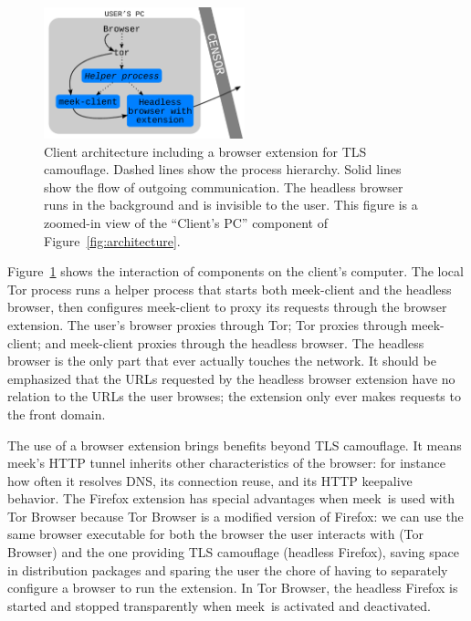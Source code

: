 \documentclass[conference]{IEEEtran}
\newcommand{\meekclient}{\mbox{meek-client}\xspace}
\newcommand{\meek}{meek\xspace}
\begin{document}
\begin{figure}
\centering
\includegraphics[height=1.5in]{browser-architecture}
\caption{
Client architecture including a browser extension for TLS camouflage.
Dashed lines show the process hierarchy.
Solid lines show the flow of outgoing communication.
The headless browser runs in the background and is invisible to the user.
This figure is a zoomed-in view of the ``Client's PC'' component of Figure~\ref{fig:architecture}.
}
\label{fig:browser-architecture}
\end{figure}

Figure~\ref{fig:browser-architecture} shows the interaction of components
on the client's computer.
The local Tor process runs a helper process that starts both \meekclient
and the headless browser,
then configures \meekclient to proxy its requests through the browser extension.
The user's browser proxies through Tor;
Tor proxies through \meekclient;
and \meekclient proxies through the headless browser.
The headless browser is the only part that ever actually touches the network.
It should be emphasized that the URLs requested by the headless browser extension
have no relation to the URLs the user browses;
the extension only ever makes requests to the front domain.

The use of a browser extension brings benefits beyond TLS camouflage.
It means \meek's HTTP tunnel inherits other characteristics of the browser:
for instance
how often it resolves DNS,
its connection reuse,
and its HTTP keepalive behavior.
The Firefox extension has special advantages
when \meek\ is used with Tor Browser
because Tor Browser
is a modified version of Firefox:
we can use the same browser executable for both the browser the user interacts with (Tor Browser)
and the one providing TLS camouflage (headless Firefox),
saving space in distribution packages
and sparing the user the chore of having to separately configure a browser to run the extension.
In Tor Browser,
the headless Firefox is started and stopped transparently
when \meek\ is activated and deactivated.

\end{document}

